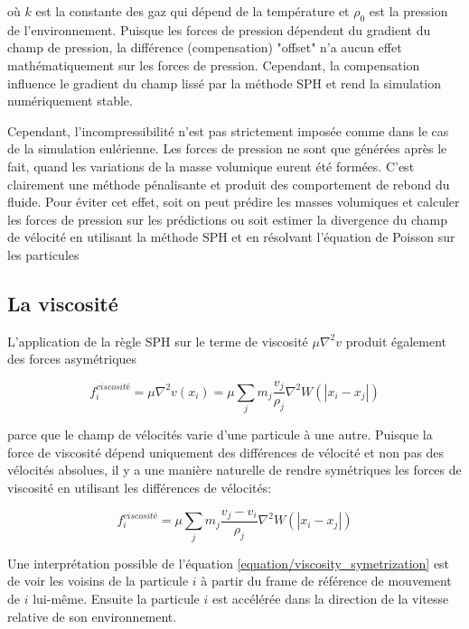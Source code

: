 \documentclass[11pt]{report}
\begin{document}
où $k$ est la constante des gaz qui dépend de la température et $\rho_0$ est la pression de l'environnement. Puisque les forces de pression dépendent du gradient du champ de pression, la différence (compensation) "offset"
 n'a aucun effet mathématiquement sur les forces de pression. Cependant, la compensation influence le gradient du champ lissé par la méthode SPH et rend la simulation numériquement stable.
 
 Cependant, l'incompressibilité n'est pas strictement imposée comme dans le cas de la simulation eulérienne. Les forces de pression ne sont que générées après le fait, quand les variations de la masse volumique eurent été formées. C'est clairement une méthode pénalisante et produit des comportement de rebond du fluide. Pour éviter cet effet, soit on peut prédire les masses volumiques et calculer les forces de pression sur les prédictions ou soit estimer la divergence du champ de vélocité en utilisant la méthode SPH et en résolvant l'équation de Poisson sur les particules \cite{premoze-2003}
 
 
\subsection{La viscosité} 
 
 L'application de la règle SPH sur  le terme de viscosité $\mu \nabla^2 v$ produit également des forces asymétriques
 
 \begin{equation}
 f_i^{viscosité} = \mu \nabla^2 v(x_i) = \mu \sum_j m_j \frac{v_j}{\rho_j} \nabla^2 W(|x_i - x_j|)
 \end{equation}
 
 parce que le champ de vélocités varie d'une particule à une autre. Puisque la force de viscosité dépend uniquement des différences de vélocité et non pas des vélocités absolues, il y a une manière naturelle de rendre symétriques les forces de viscosité en utilisant les différences de vélocités:
 
 \begin{equation}\label{equation/viscosity_symetrization}
 f_i^{viscosité} = \mu \sum_j m_j \frac{v_j - v_i}{\rho_j} \nabla^2 W(|x_i - x_j|)
\end{equation}  
 
 Une interprétation possible de l'équation \ref{equation/viscosity_symetrization}
est de voir les voisins de la particule $i$  à partir du frame de référence de mouvement de $i$ lui-même. Ensuite la particule $i$  est accélérée dans la direction de la vitesse relative de son environnement.
\end{document}
